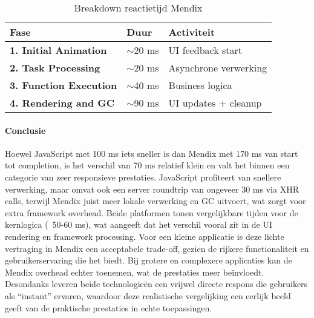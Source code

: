 \begin{table}[H]
    \centering
    \begin{tabular}{|p{}|p{3cm}|p{6cm}|}
        \hline
        \textbf{Fase} & \textbf{Duur} & \textbf{Activiteit}\\
        \hline
        \textbf{1. Initial Animation}  & $\sim$20 ms & \gls{UI} feedback start \\
        \hline
        \textbf{2. Task Processing} & $\sim$20 ms & Asynchrone verwerking \\
        \hline
        \textbf{3. Function Execution}  & $\sim$40 ms & Business logica \\
        \hline
        \textbf{4. Rendering and \gls{GC}}  & $\sim$90 ms & \gls{UI} updates + cleanup \\
        \hline                       
        
    \end{tabular}
    \caption[\centering Breakdown reactietijd Mendix]{\label{tab:breakdown Mendix reactietijd}Breakdown reactietijd Mendix}
\end{table}


\pagebreak
\newpage


\paragraph{Conclusie}
Hoewel JavaScript met 100 ms iets sneller is dan Mendix met 170 ms van start tot completion, is het verschil van 70 ms relatief klein en valt het binnen een categorie van zeer responsieve prestaties. JavaScript profiteert van snellere verwerking, maar omvat ook een server roundtrip van ongeveer 30 ms via \gls{XHR} calls, terwijl Mendix juist meer lokale verwerking en \gls{GC} uitvoert, wat zorgt voor extra framework overhead. Beide platformen tonen vergelijkbare tijden voor de kernlogica (~50-60 ms), wat aangeeft dat het verschil vooral zit in de \gls{UI} rendering en framework processing. Voor een kleine applicatie is deze lichte vertraging in Mendix een acceptabele trade-off, gezien de rijkere functionaliteit en gebruikerservaring die het biedt. Bij grotere en complexere applicaties kan de Mendix overhead echter toenemen, wat de prestaties meer beïnvloedt. Desondanks leveren beide technologieën een vrijwel directe respons die gebruikers als “instant” ervaren, waardoor deze realistische vergelijking een eerlijk beeld geeft van de praktische prestaties in echte toepassingen.



